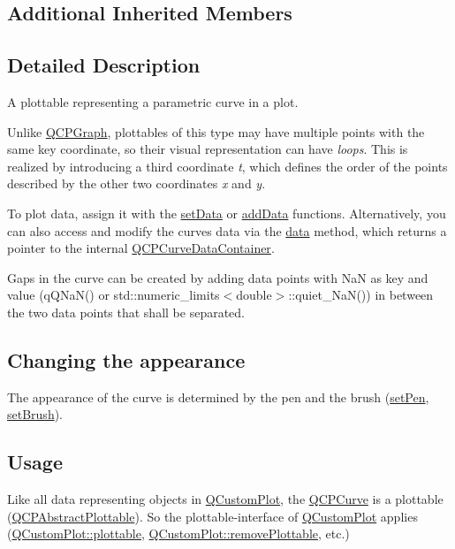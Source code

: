 \subsection*{Additional Inherited Members}


\subsection{Detailed Description}
A plottable representing a parametric curve in a plot. 



Unlike \hyperlink{class_q_c_p_graph}{Q\+C\+P\+Graph}, plottables of this type may have multiple points with the same key coordinate, so their visual representation can have {\itshape loops}. This is realized by introducing a third coordinate {\itshape t}, which defines the order of the points described by the other two coordinates {\itshape x} and {\itshape y}.

To plot data, assign it with the \hyperlink{class_q_c_p_curve_a41246850d2e080bc57183ca19cd4135e}{set\+Data} or \hyperlink{class_q_c_p_curve_a73edf394b94f3f24f07518e30565a07f}{add\+Data} functions. Alternatively, you can also access and modify the curve\textquotesingle{}s data via the \hyperlink{class_q_c_p_curve_a761492fd00b1ab7cb18ce23c118c6c60}{data} method, which returns a pointer to the internal \hyperlink{qcustomplot_8h_aaeee80d5664ea91beb9d7968790d0e65}{Q\+C\+P\+Curve\+Data\+Container}.

Gaps in the curve can be created by adding data points with NaN as key and value ({\ttfamily q\+Q\+Na\+N()} or {\ttfamily std\+::numeric\+\_\+limits$<$double$>$\+::quiet\+\_\+\+Na\+N()}) in between the two data points that shall be separated.\hypertarget{class_q_c_p_curve_qcpcurve-appearance}{}\subsection{Changing the appearance}\label{class_q_c_p_curve_qcpcurve-appearance}
The appearance of the curve is determined by the pen and the brush (\hyperlink{class_q_c_p_abstract_plottable_ab74b09ae4c0e7e13142fe4b5bf46cac7}{set\+Pen}, \hyperlink{class_q_c_p_abstract_plottable_a7a4b92144dca6453a1f0f210e27edc74}{set\+Brush}).\hypertarget{class_q_c_p_curve_qcpcurve-usage}{}\subsection{Usage}\label{class_q_c_p_curve_qcpcurve-usage}
Like all data representing objects in \hyperlink{class_q_custom_plot}{Q\+Custom\+Plot}, the \hyperlink{class_q_c_p_curve}{Q\+C\+P\+Curve} is a plottable (\hyperlink{class_q_c_p_abstract_plottable}{Q\+C\+P\+Abstract\+Plottable}). So the plottable-\/interface of \hyperlink{class_q_custom_plot}{Q\+Custom\+Plot} applies (\hyperlink{class_q_custom_plot_a32de81ff53e263e785b83b52ecd99d6f}{Q\+Custom\+Plot\+::plottable}, \hyperlink{class_q_custom_plot_af3dafd56884208474f311d6226513ab2}{Q\+Custom\+Plot\+::remove\+Plottable}, etc.)

